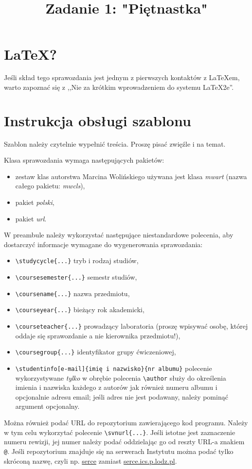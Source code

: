 \documentclass{classrep}
\author{
  \studentinfo{Radosław Pacholski}{195779} \and
  \studentinfo{Rafał Stężalski}{195792} 
}
\title{Zadanie 1: "Piętnastka"}
\begin{document}
\maketitle

\section{\LaTeX?}
Jeśli skład tego sprawozdania jest jednym z pierwszych kontaktów z
\LaTeX\dywiz em, warto zapoznać się z ,,Nie za krótkim wprowadzeniem do
systemu \LaTeX2e''\cite{l2short}.

\section{Instrukcja obsługi szablonu}
Szablon należy czytelnie wypełnić treścia. Proszę pisać zwięźle i na temat.

Klasa sprawozdania wymaga następujących pakietów:
\begin{itemize}
  \item zestaw klas autorstwa Marcina Wolińskiego \ppauza używana jest klasa
    \emph{mwart} (nazwa całego pakietu: \emph{mwcls}),
  \item pakiet \emph{polski},
  \item pakiet \emph{url}.
\end{itemize}

W preambule należy wykorzystać następujące niestandardowe polecenia, aby
dostarczyć informacje wymagane do wygenerowania sprawozdania:
\begin{itemize}
  \item \verb+\studycycle{...}+ \ppauza tryb i rodzaj studiów,
  \item \verb+\coursesemester{...}+ \ppauza semestr studiów,
  \item \verb+\coursename{...}+ \ppauza nazwa przedmiotu,
  \item \verb+\courseyear{...}+ \ppauza bieżący rok akademicki,
  \item \verb+\courseteacher{...}+ \ppauza prowadzący laboratoria (proszę
    wpisywać osobę, której oddaje się sprawozdanie a nie kierownika
    przedmiotu!),
  \item \verb+\coursegroup{...}+ \ppauza identyfikator grupy ćwiczeniowej,
  \item \verb+\studentinfo[e-mail]{imię i nazwisko}{nr albumu}+ \ppauza
    polecenie wykorzystywane \emph{tylko} w obrębie polecenia \verb+\author+
    służy do określenia imienia i nazwiska każdego z autorów jak również
    numeru albumu i opcjonalnie adresu e\dywiz mail; jeśli adres nie jest
    podawany, należy pominąć argument opcjonalny.
\end{itemize}
Można również podać URL do repozytorium zawierającego kod programu. Należy w
tym celu wykorzytać polecenie \verb+\svnurl{...}+. Jeśli istotne jest
zaznaczenie numeru rewizji, jej numer należy podać oddzielając go od reszty
URL-a znakiem \verb+@+. Jeśli repozytorium znajduje się na serwerach Instytutu
można podać tylko skróconą nazwę, czyli np. \url{serce} zamiast
\url{serce.ics.p.lodz.pl}.
\end{document}
